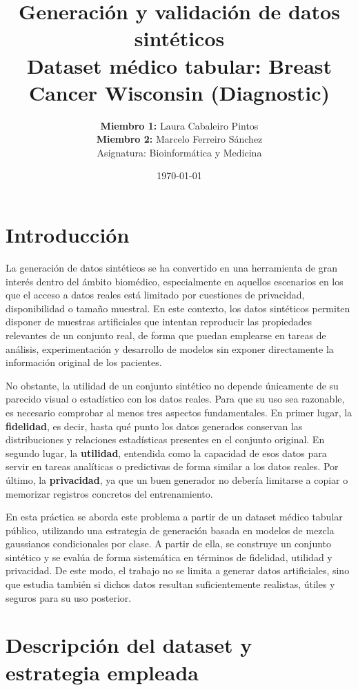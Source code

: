 \documentclass[11pt,a4paper]{article}
\title{\textbf{Generación y validación de datos sintéticos}\\
\large Dataset médico tabular: Breast Cancer Wisconsin (Diagnostic)}
\author{\textbf{Miembro 1:} Laura Cabaleiro Pintos \\
\textbf{Miembro 2:} Marcelo Ferreiro Sánchez \\
Asignatura: Bioinformática y Medicina}
\date{\today}
\begin{document}
\maketitle
\thispagestyle{empty}

\section{Introducción}

La generación de datos sintéticos se ha convertido en una herramienta de gran interés dentro del ámbito biomédico, especialmente en aquellos escenarios en los que el acceso a datos reales está limitado por cuestiones de privacidad, disponibilidad o tamaño muestral. En este contexto, los datos sintéticos permiten disponer de muestras artificiales que intentan reproducir las propiedades relevantes de un conjunto real, de forma que puedan emplearse en tareas de análisis, experimentación y desarrollo de modelos sin exponer directamente la información original de los pacientes.

No obstante, la utilidad de un conjunto sintético no depende únicamente de su parecido visual o estadístico con los datos reales. Para que su uso sea razonable, es necesario comprobar al menos tres aspectos fundamentales. En primer lugar, la \textbf{fidelidad}, es decir, hasta qué punto los datos generados conservan las distribuciones y relaciones estadísticas presentes en el conjunto original. En segundo lugar, la \textbf{utilidad}, entendida como la capacidad de esos datos para servir en tareas analíticas o predictivas de forma similar a los datos reales. Por último, la \textbf{privacidad}, ya que un buen generador no debería limitarse a copiar o memorizar registros concretos del entrenamiento.

En esta práctica se aborda este problema a partir de un dataset médico tabular público, utilizando una estrategia de generación basada en modelos de mezcla gaussianos condicionales por clase. A partir de ella, se construye un conjunto sintético y se evalúa de forma sistemática en términos de fidelidad, utilidad y privacidad. De este modo, el trabajo no se limita a generar datos artificiales, sino que estudia también si dichos datos resultan suficientemente realistas, útiles y seguros para su uso posterior.

\section{Descripción del dataset y estrategia empleada}
\end{document}
